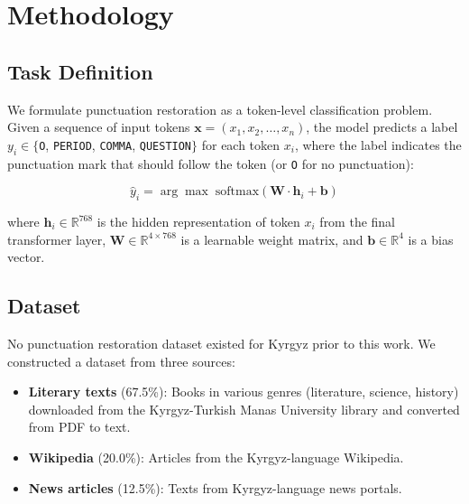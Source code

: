 \documentclass[manuscript, review]{acmart}
\begin{document}
\section{Methodology}
\label{sec:method}

\subsection{Task Definition}

We formulate punctuation restoration as a token-level classification problem. Given a sequence of input tokens $\mathbf{x} = (x_1, x_2, \ldots, x_n)$, the model predicts a label $y_i \in \{$\texttt{O}, \texttt{PERIOD}, \texttt{COMMA}, \texttt{QUESTION}$\}$ for each token $x_i$, where the label indicates the punctuation mark that should follow the token (or \texttt{O} for no punctuation):

\begin{equation}
\hat{y}_i = \arg\max \; \text{softmax}(\mathbf{W} \cdot \mathbf{h}_i + \mathbf{b})
\end{equation}

\noindent where $\mathbf{h}_i \in \mathbb{R}^{768}$ is the hidden representation of token $x_i$ from the final transformer layer, $\mathbf{W} \in \mathbb{R}^{4 \times 768}$ is a learnable weight matrix, and $\mathbf{b} \in \mathbb{R}^{4}$ is a bias vector.

\subsection{Dataset}
\label{sec:dataset}

No punctuation restoration dataset existed for Kyrgyz prior to this work. We constructed a dataset from three sources:

\begin{itemize}
    \item \textbf{Literary texts} (67.5\%): Books in various genres (literature, science, history) downloaded from the Kyrgyz-Turkish Manas University library and converted from PDF to text.
    \item \textbf{Wikipedia} (20.0\%): Articles from the Kyrgyz-language Wikipedia.
    \item \textbf{News articles} (12.5\%): Texts from Kyrgyz-language news portals.
\end{itemize}
\end{document}
